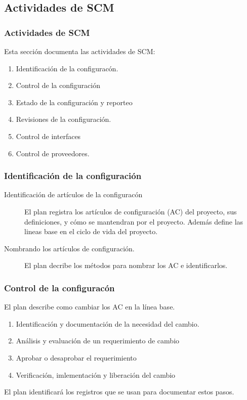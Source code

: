 \subsection{Actividades de SCM}
\begin{frame}
	\frametitle{Actividades de SCM}
Esta secci\'on documenta las actividades de SCM:
	\begin{enumerate}
		\item Identificaci\'on de la configurac\'on.
		\item Control de la configuraci\'on
		\item Estado de la configuraci\'on y reporteo
		\item Revisiones de la configuraci\'on. 
		\item Control de interfaces
		\item Control de proveedores. 
	\end{enumerate}
\end{frame}
\begin{frame}
	\frametitle{Identificaci\'on de la configuraci\'on}
	\begin{description}
		\item [Identificaci\'on de art\'iculos de la configurac\'on] 
			El plan registra los art\'iculos de configuraci\'on (AC) del 
			proyecto, sus definiciones, y c\'omo se mantendran por 
			el proyecto. Adem\'as define las lineas base en el ciclo
			de vida del proyecto. 
		\item [Nombrando los art\'iculos de configuraci\'on.] 
			El plan decribe los m\'etodos para nombrar los AC e 
			identificarlos. 
	\end{description}
\end{frame}
\begin{frame}
	\frametitle{Control de la configurac\'on}
	El plan describe como cambiar los AC en la l\'inea base.
	\begin{enumerate}
		\item Identificaci\'on y documentaci\'on de la necesidad del cambio.
		\item An\'alisis y evaluaci\'on de un requerimiento de cambio
		\item Aprobar o desaprobar el requerimiento
		\item Verificaci\'on, imlementaci\'on y liberaci\'on del cambio
	\end{enumerate}
	El plan identificar\'a los registros que se usan para documentar estos pasos. 
\end{frame}
